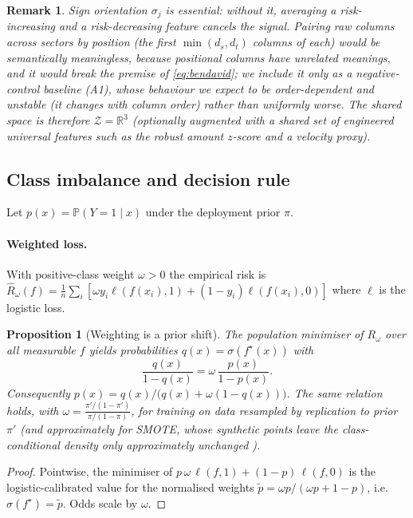 \documentclass[journal]{IEEEtran}
\newtheorem{proposition}{Proposition}
\newtheorem{remark}{Remark}
\newcommand{\R}{\mathbb{R}}
\newcommand{\Prob}{\mathbb{P}}
\newcommand{\1}{\mathbf{1}}
\newcommand{\Zspace}{\mathcal{Z}}
\begin{document}
\begin{remark}
Sign orientation $\sigma_j$ is essential: without it, averaging a risk-increasing and a risk-decreasing feature cancels the signal. Pairing raw columns across sectors by position (the first $\min(d_s,d_t)$ columns of each) would be semantically meaningless, because positional columns have unrelated meanings, and it would break the premise of \eqref{eq:bendavid}; we include it only as a negative-control baseline (A1), whose behaviour we expect to be order-dependent and unstable (it changes with column order) rather than uniformly worse. The shared space is therefore $\Zspace=\R^3$ (optionally augmented with a shared set of engineered universal features such as the robust amount $z$-score and a velocity proxy).
\end{remark}

\subsection{Class imbalance and decision rule}\label{sec:imbalance}
Let $p(x)=\Prob(Y=1\mid x)$ under the deployment prior $\pi$.

\paragraph{Weighted loss.} With positive-class weight $\omega>0$ the empirical risk is $\hat R_\omega(f)=\frac1n\sum_i[\omega y_i\ell(f(x_i),1)+(1-y_i)\ell(f(x_i),0)]$ where $\ell$ is the logistic loss.

\begin{proposition}[Weighting is a prior shift]\label{prop:weight}
The population minimiser of $R_\omega$ over all measurable $f$ yields probabilities $q(x)=\sigma(f^\star(x))$ with
\begin{equation}
\frac{q(x)}{1-q(x)}=\omega\,\frac{p(x)}{1-p(x)}.
\end{equation}
Consequently $p(x)=q(x)/\big(q(x)+\omega(1-q(x))\big)$. The same relation holds, with $\omega=\frac{\pi'/(1-\pi')}{\pi/(1-\pi)}$, for training on data resampled by replication to prior $\pi'$ (and approximately for SMOTE, whose synthetic points leave the class-conditional density only approximately unchanged \cite{chawla2002smote,dalpozzolo2015calibrating}).
\end{proposition}
\begin{proof}
Pointwise, the minimiser of $p\,\omega\,\ell(f,1)+(1-p)\,\ell(f,0)$ is the logistic-calibrated value for the normalised weights $\tilde p=\omega p/(\omega p+1-p)$, i.e.\ $\sigma(f^\star)=\tilde p$. Odds scale by $\omega$. \end{proof}
\end{document}
